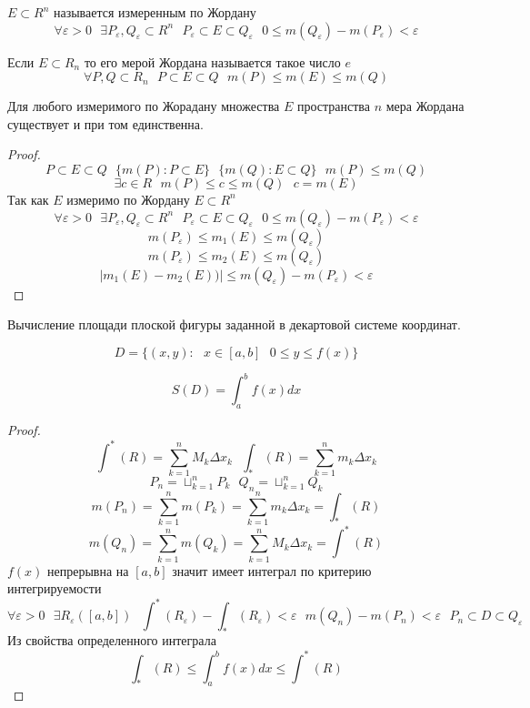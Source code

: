 \begin{defin}
  $E \subset R^n$ называется измеренным по Жордану
  $$
  \forall \varepsilon > 0 ~~~
  \exists P_{\varepsilon}, Q_{\varepsilon} \subset R^n ~~~
  P_{\varepsilon} \subset E \subset Q_{\varepsilon} ~~~
  0 \le m(Q_{\varepsilon}) - m(P_{\varepsilon}) < \varepsilon
  $$
\end{defin}

  Если $E \subset R_n$ то его мерой Жордана называется такое число $e$
  $$
  \forall P,Q \subset R_n ~~~
  P \subset E \subset Q ~~~
  m(P) \le m(E) \le m(Q)
  $$

\begin{theorem}
  Для любого измеримого по Жорадану множества $E$ пространства $n$ мера Жордана
существует и при том единственна.
\end{theorem}

\begin{proof}
  $$
  P \subset E \subset Q ~~~
  \{ m(P): P \subset E \} ~~~
  \{ m(Q): E \subset Q \} ~~~
  m(P) \le m(Q)
  $$
  $$
  \exists c \in R ~~~
  m(P) \le c \le m(Q) ~~~
  c = m(E)
  $$
  Так как $E$ измеримо по Жордану $E \subset R^n$
  $$
  \forall \varepsilon > 0 ~~~
  \exists P_{\varepsilon},Q_{\varepsilon} \subset R^n ~~~
  P_{\varepsilon} \subset E \subset Q_{\varepsilon} ~~~
  0 \le m(Q_{\varepsilon}) - m(P_\varepsilon) < \varepsilon
  $$
  $$
  m(P_{\varepsilon}) \le m_1 (E) \le m(Q_{\varepsilon})
  $$
  $$
  m(P_{\varepsilon}) \le m_2 (E) \le m(Q_{\varepsilon})
  $$
  $$
  |m_1 (E) - m_2 (E))| \le m(Q_{\varepsilon}) - m(P_{\varepsilon}) < \varepsilon
  $$
\end{proof}

\begin{title}[\Large]
  Вычисление площади плоской фигуры заданной в декартовой системе координат.
\end{title}

\begin{defin}
 $$
  D = \{ (x,y): ~~~ x \in [a,b]  ~~~ 0 \le y \le f(x) \}
 $$
\end{defin}

\begin{theorem}
  $$
  S(D) = \int_a^b f(x) dx
  $$
\end{theorem}

\begin{proof}
  $$
  \int^* (R) = \sum_{k=1}^n M_k \Delta x_k ~~~
  \int_* (R) = \sum_{k=1}^n m_k \Delta x_k
  $$
  $$
  P_n = \sqcup_{k=1}^n P_k ~~~
  Q_n = \sqcup_{k=1}^n Q_k
  $$
  $$
  m(P_n) = \sum_{k=1}^n m(P_k) = \sum_{k=1}^n m_k \Delta x_k = \int_* (R)
  $$
  $$
  m(Q_n) = \sum_{k=1}^n m(Q_k) = \sum_{k=1}^n M_k \Delta x_k = \int^* (R)
  $$
  $f(x)$ непрерывна на $[a,b]$ значит имеет интеграл по критерию интегрируемости
  $$
  \forall \varepsilon > 0 ~~~
  \exists R_{\varepsilon} ([a,b]) ~~~
  \int^*(R_{\varepsilon}) - \int_* (R_{\varepsilon}) < \varepsilon ~~~
  m(Q_n) - m(P_n) < \varepsilon ~~~
  P_n \subset D \subset Q_{\varepsilon}
  $$
  Из свойства определенного интеграла
  $$
  \int_* (R) \le \int_a^b f(x)dx \le \int^* (R)
  $$
\end{proof}

